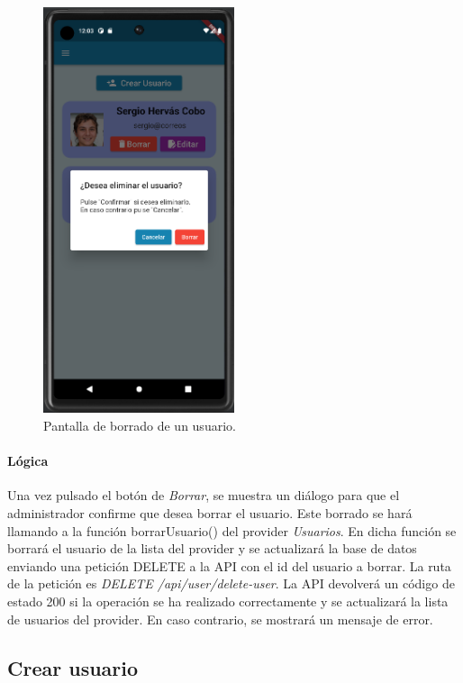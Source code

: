 \begin{figure}[H]
  \centering
  \includegraphics[width=0.5\textwidth]{imagenes/c7/borrarusuario.png}
  \caption{Pantalla de borrado de un usuario.} 
  \label{fig:borradousuario}
\end{figure}

\paragraph*{Lógica}
Una vez pulsado el botón de \textit{Borrar}, se muestra un diálogo para que el administrador confirme que desea borrar el usuario. Este borrado se hará
 llamando a la función borrarUsuario() del provider \textit{Usuarios}. En dicha función se borrará el usuario de la lista del provider 
y se actualizará la base de datos enviando una petición DELETE a la API con el id del usuario a borrar. La ruta de la petición es \textit{DELETE /api/user/delete-user}. 
La API devolverá un código de estado 200 si la operación se ha realizado correctamente y se actualizará la lista de usuarios del provider. En caso contrario, 
se mostrará un mensaje de error.

\subsection{Crear usuario} 

